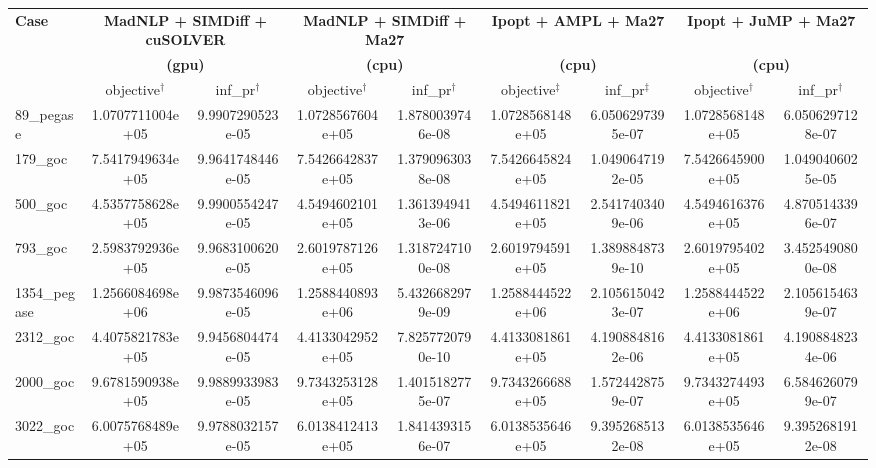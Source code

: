 \documentclass{standalone}
\begin{document}
\centering
\begin{tabular}{|l|cc|cc|cc|cc|}
  \hline
  \multirow{3}{*}{\textbf{Case}}
  & \multicolumn{2}{c|}{\textbf{MadNLP + SIMDiff + cuSOLVER}}
  & \multicolumn{2}{c|}{\textbf{MadNLP + SIMDiff + Ma27}}
  & \multicolumn{2}{c|}{\textbf{Ipopt + AMPL + Ma27}}
  & \multicolumn{2}{c|}{\textbf{Ipopt + JuMP + Ma27}}\\
  &\multicolumn{2}{c|}{\textbf{(gpu)}} &\multicolumn{2}{c|}{\textbf{(cpu)}} &\multicolumn{2}{c|}{\textbf{(cpu)}}&\multicolumn{2}{c|}{\textbf{(cpu)}}
  \\
  \cline{2-9}
  & objective$^\dag$ & inf\_pr$^\dag$
  & objective$^\dag$ & inf\_pr$^\dag$
  & objective$^\ddag$ & inf\_pr$^\ddag$
  & objective$^\dag$ & inf\_pr$^\dag$
  \\
  \hline
89\_pegase 
& 1.0707711004e+05
& 9.9907290523e-05
& 1.0728567604e+05
& 1.8780039746e-08
& 1.0728568148e+05
& 6.0506297395e-07
& 1.0728568148e+05
& 6.0506297128e-07
\\

179\_goc 
& 7.5417949634e+05
& 9.9641748446e-05
& 7.5426642837e+05
& 1.3790963038e-08
& 7.5426645824e+05
& 1.0490647192e-05
& 7.5426645900e+05
& 1.0490406025e-05
\\

500\_goc 
& 4.5357758628e+05
& 9.9900554247e-05
& 4.5494602101e+05
& 1.3613949413e-06
& 4.5494611821e+05
& 2.5417403409e-06
& 4.5494616376e+05
& 4.8705143396e-07
\\

793\_goc 
& 2.5983792936e+05
& 9.9683100620e-05
& 2.6019787126e+05
& 1.3187247100e-08
& 2.6019794591e+05
& 1.3898848739e-10
& 2.6019795402e+05
& 3.4525490800e-08
\\

1354\_pegase 
& 1.2566084698e+06
& 9.9873546096e-05
& 1.2588440893e+06
& 5.4326682979e-09
& 1.2588444522e+06
& 2.1056150423e-07
& 1.2588444522e+06
& 2.1056154639e-07
\\
\hline
2312\_goc 
& 4.4075821783e+05
& 9.9456804474e-05
& 4.4133042952e+05
& 7.8257720790e-10
& 4.4133081861e+05
& 4.1908848162e-06
& 4.4133081861e+05
& 4.1908848234e-06
\\

2000\_goc 
& 9.6781590938e+05
& 9.9889933983e-05
& 9.7343253128e+05
& 1.4015182775e-07
& 9.7343266688e+05
& 1.5724428759e-07
& 9.7343274493e+05
& 6.5846260799e-07
\\

3022\_goc 
& 6.0075768489e+05
& 9.9788032157e-05
& 6.0138412413e+05
& 1.8414393156e-07
& 6.0138535646e+05
& 9.3952685132e-08
& 6.0138535646e+05
& 9.3952681912e-08
\\


\end{tabular}
\end{document}
